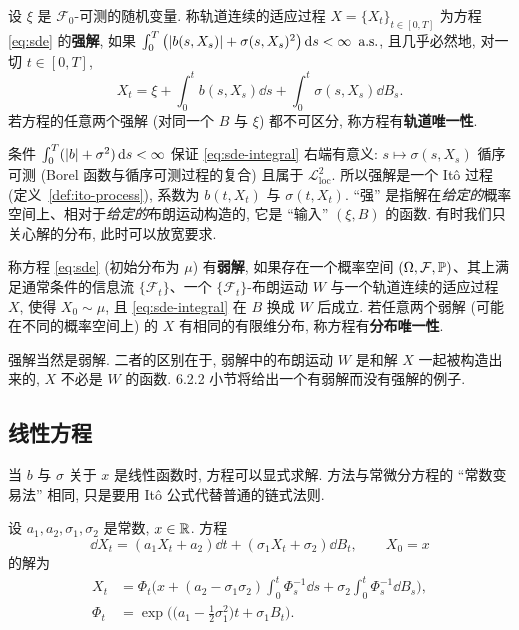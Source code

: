 \begin{definition}[强解]\label{def:strong-solution}
设 $\xi$ 是 $\mathcal{F}_0$-可测的随机变量. 称轨道连续的适应过程 $X=\{X_t\}_{t\in[0,T]}$ 为方程 \eqref{eq:sde} 的\textbf{强解}, 如果 $\int_0^T\big(\abs{b(s,X_s)}+\sigma(s,X_s)^2\big)\dd s<\infty$ $\as$, 且几乎必然地, 对一切 $t\in[0,T]$,
\begin{equation}\label{eq:sde-integral}
X_t=\xi+\int_0^tb(s,X_s)\dd s+\int_0^t\sigma(s,X_s)\dd B_s.
\end{equation}
若方程的任意两个强解 (对同一个 $B$ 与 $\xi$) 都不可区分, 称方程有\textbf{轨道唯一性}.
\end{definition}

条件 $\int_0^T(\abs{b}+\sigma^2)\dd s<\infty$ 保证 \eqref{eq:sde-integral} 右端有意义: $s\mapsto\sigma(s,X_s)$ 循序可测 (Borel 函数与循序可测过程的复合) 且属于 $\mathscr{L}^2_{\mathrm{loc}}$. 所以强解是一个 It\^o 过程 (定义~\ref{def:ito-process}), 系数为 $b(t,X_t)$ 与 $\sigma(t,X_t)$. ``强'' 是指解在\emph{给定的}概率空间上、相对于\emph{给定的}布朗运动构造的, 它是 ``输入'' $(\xi,B)$ 的函数. 有时我们只关心解的分布, 此时可以放宽要求.

\begin{definition}[弱解]\label{def:weak-solution}
称方程 \eqref{eq:sde} (初始分布为 $\mu$) 有\textbf{弱解}, 如果存在一个概率空间 $(\Omega,\mathcal{F},\P)$、其上满足通常条件的信息流 $\{\mathcal{F}_t\}$、一个 $\{\mathcal{F}_t\}$-布朗运动 $W$ 与一个轨道连续的适应过程 $X$, 使得 $X_0\sim\mu$, 且 \eqref{eq:sde-integral} 在 $B$ 换成 $W$ 后成立. 若任意两个弱解 (可能在不同的概率空间上) 的 $X$ 有相同的有限维分布, 称方程有\textbf{分布唯一性}.
\end{definition}

强解当然是弱解. 二者的区别在于, 弱解中的布朗运动 $W$ 是和解 $X$ 一起被构造出来的, $X$ 不必是 $W$ 的函数. 6.2.2 小节将给出一个有弱解而没有强解的例子.

\subsection{线性方程}

当 $b$ 与 $\sigma$ 关于 $x$ 是线性函数时, 方程可以显式求解. 方法与常微分方程的 ``常数变易法'' 相同, 只是要用 It\^o 公式代替普通的链式法则.

\begin{proposition}[一维线性方程]\label{prop:linear-sde}
设 $a_1,a_2,\sigma_1,\sigma_2$ 是常数, $x\in\R$. 方程
\begin{equation}\label{eq:linear-sde}
\dd X_t=(a_1X_t+a_2)\dd t+(\sigma_1X_t+\sigma_2)\dd B_t,\qquad X_0=x
\end{equation}
的解为
\begin{align*}
X_t&=\Phi_t\Big(x+(a_2-\sigma_1\sigma_2)\int_0^t\Phi_s^{-1}\dd s+\sigma_2\int_0^t\Phi_s^{-1}\dd B_s\Big),\\
\Phi_t&=\exp\Big(\big(a_1-\tfrac{1}{2}\sigma_1^2\big)t+\sigma_1B_t\Big).
\end{align*}
\end{proposition}

